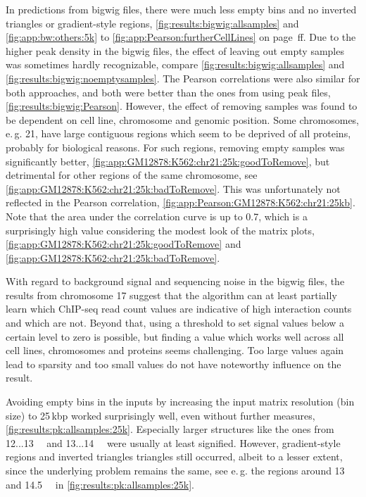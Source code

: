 In predictions from bigwig files, there were much less empty bins and no inverted triangles or gradient-style regions, 
\autoref{fig:results:bigwig:allsamples} and \autoref{fig:app:bw:others:5k} to \ref{fig:app:Pearson:furtherCellLines} 
on page \pageref{fig:app:bw:others:5k}\,ff.
Due to the higher peak density in the bigwig files, the effect of leaving out 
empty samples was sometimes hardly recognizable, compare \autoref{fig:results:bigwig:allsamples} and \ref{fig:results:bigwig:noemptysamples}.
The Pearson correlations were also similar for both approaches, and both were better than the ones from using peak files, 
\autoref{fig:results:bigwig:Pearson}.
However, the effect of removing samples was found to be dependent on cell line, chromosome and genomic position. 
Some chromosomes, e.\,g. 21, have large contiguous regions which seem to be deprived of all proteins,
probably for biological reasons.
For such regions, removing empty samples was significantly better, \autoref{fig:app:GM12878:K562:chr21:25k:goodToRemove}, 
but detrimental for other regions of the same chromosome, see \autoref{fig:app:GM12878:K562:chr21:25k:badToRemove}.
This was unfortunately not reflected in the Pearson correlation, \autoref{fig:app:Pearson:GM12878:K562:chr21:25kb}.
Note that the area under the correlation curve is up to 0.7, which is a surprisingly high value considering
the modest look of the matrix plots, \autoref{fig:app:GM12878:K562:chr21:25k:goodToRemove} 
and \ref{fig:app:GM12878:K562:chr21:25k:badToRemove}.

With regard to background signal and sequencing noise in the bigwig files, 
the results from chromosome 17 suggest that the algorithm can at least partially 
learn which ChIP-seq read count values are indicative of high interaction counts and which are not. 
Beyond that, using a threshold to set signal values below a certain level to zero is possible,
but finding a value which works well across all cell lines, chromosomes and proteins seems challenging.
Too large values again lead to sparsity and too small values
do not have noteworthy influence on the result.

Avoiding empty bins in the inputs by increasing the input matrix resolution (bin size) to 25\,kbp 
worked surprisingly well, even without further measures, \autoref{fig:results:pk:allsamples:25k}.
Especially larger structures like the ones from 12...\SI{13}{\mega\bp} and 13...\SI{14}{\mega\bp} were usually at least signified.
However, gradient-style regions and inverted triangles triangles still occurred, albeit to a lesser extent, 
since the underlying problem remains the same, see e.\,g. the regions around 13 and \SI{14.5}{\mega\bp}
in \autoref{fig:results:pk:allsamples:25k}.

